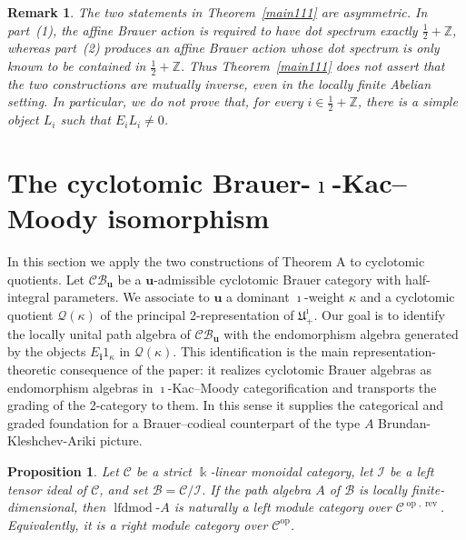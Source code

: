 \documentclass[a4,10pt]{amsart}
\numberwithin{equation}{section}
\newtheorem{Prop}[Theorem]{Proposition}
\newtheorem{rem}[Theorem]{Remark}
\theoremstyle{definition}
\begin{document}
 
 

\begin{rem}
    The two statements  in Theorem~\ref{main111} are
asymmetric. In part~(1), the affine Brauer action is required to have
dot spectrum exactly $\frac12+\mathbb Z$, whereas part~(2) produces an
affine Brauer action whose dot spectrum is only known to be contained in
$\frac12+\mathbb Z$. Thus Theorem~\ref{main111} does not assert that the two
constructions are mutually inverse, even in the locally finite Abelian
setting. In particular, we do not prove that, for every $i\in \frac12+\mathbb Z$, there is a simple object $L_i$  such that 
$E_iL_i\neq0$.\end{rem}



\section{The cyclotomic Brauer-$\imath$-Kac--Moody isomorphism}
In this section we apply the two constructions of Theorem A to cyclotomic quotients. Let $\mathcal{CB}_{\mathbf u}$ be a $\mathbf u$-admissible cyclotomic Brauer category with half-integral parameters. We associate to $\mathbf u$ a dominant $\imath$-weight $\kappa$ and a cyclotomic quotient $\mathcal Q(\kappa)$ of the principal 2-representation of $\mathfrak U^{\imath}_{+}$. Our goal is to identify the locally unital path algebra of $\mathcal{CB}_{\mathbf u}$ with the endomorphism algebra generated by the objects $E_{\mathbf i}1_{\kappa}$ in $\mathcal Q(\kappa)$. This identification is the main representation-theoretic consequence of the paper: it realizes cyclotomic Brauer algebras as endomorphism algebras in $\imath$-Kac--Moody categorification and transports the grading of the 2-category to them. In this sense it supplies the categorical and graded foundation for a Brauer--codieal counterpart of the type $A$ Brundan-Kleshchev-Ariki picture. 




\begin{Prop}\label{gen123}
Let $\mathcal C$ be a strict $\Bbbk$-linear monoidal category,
let $\mathcal I$ be a left tensor ideal of $\mathcal C$, and set
$\mathcal B=\mathcal C/\mathcal I$. If the path algebra $A$ of
$\mathcal B$ is locally finite-dimensional, then
$\operatorname{lfdmod}\text{-}A$ is naturally a left module category
over $\mathcal C^{\operatorname{op},\operatorname{rev}}$.
Equivalently, it is a right module category over
$\mathcal C^{\operatorname{op}}$.
\end{Prop}
\end{document}
